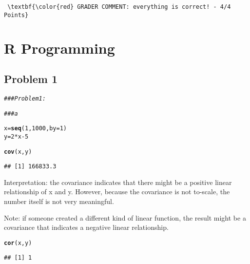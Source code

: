 \documentclass[12pt,letter]{article}\usepackage[]{graphicx}\usepackage[]{color}
\makeatletter
\newcommand{\hlnum}[1]{\textcolor[rgb]{0.686,0.059,0.569}{#1}}%
\newcommand{\hlcom}[1]{\textcolor[rgb]{0.678,0.584,0.686}{\textit{#1}}}%
\newcommand{\hlopt}[1]{\textcolor[rgb]{0,0,0}{#1}}%
\newcommand{\hlstd}[1]{\textcolor[rgb]{0.345,0.345,0.345}{#1}}%
\newcommand{\hlkwb}[1]{\textcolor[rgb]{0.69,0.353,0.396}{#1}}%
\newcommand{\hlkwc}[1]{\textcolor[rgb]{0.333,0.667,0.333}{#1}}%
\newcommand{\hlkwd}[1]{\textcolor[rgb]{0.737,0.353,0.396}{\textbf{#1}}}%
\newenvironment{kframe}{%
 \def\at@end@of@kframe{}%
 \ifinner\ifhmode%
  \def\at@end@of@kframe{\end{minipage}}%
  \begin{minipage}{\columnwidth}%
 \fi\fi%
 \def\FrameCommand##1{\hskip\@totalleftmargin \hskip-\fboxsep
 \colorbox{shadecolor}{##1}\hskip-\fboxsep
     \hskip-\linewidth \hskip-\@totalleftmargin \hskip\columnwidth}%
 \MakeFramed {\advance\hsize-\width
   \@totalleftmargin\z@ \linewidth\hsize
   \@setminipage}}%
 {\par\unskip\endMakeFramed%
 \at@end@of@kframe}
\newenvironment{knitrout}{}{} %
\makeatother
\begin{document}
\begin{verbatim} \textbf{\color{red} GRADER COMMENT: everything is correct! - 4/4 Points} \end{verbatim}



\pagebreak

\section*{R Programming}

\subsection*{Problem 1}

\begin{knitrout}
\color{fgcolor}\begin{kframe}
\begin{alltt}
\hlcom{### Problem 1:}

\hlcom{### a}

\hlstd{x} \hlkwb{=} \hlkwd{seq}\hlstd{(}\hlnum{1}\hlstd{,} \hlnum{1000}\hlstd{,} \hlkwc{by} \hlstd{=} \hlnum{1}\hlstd{)}
\hlstd{y} \hlkwb{=} \hlnum{2} \hlopt{*} \hlstd{x} \hlopt{-} \hlnum{5}

\hlkwd{cov}\hlstd{(x, y)}
\end{alltt}
\begin{verbatim}
## [1] 166833.3
\end{verbatim}
\end{kframe}
\end{knitrout}

Interpretation: the covariance indicates that there might be a positive linear relationship of x and y. However, because the covariance is not to-scale, the number itself is not very meaningful.

Note: if someone created a different kind of linear function, the result might be a covariance that indicates a negative linear relationship.

\begin{knitrout}
\color{fgcolor}\begin{kframe}
\begin{alltt}
\hlkwd{cor}\hlstd{(x, y)}
\end{alltt}
\begin{verbatim}
## [1] 1
\end{verbatim}
\end{kframe}
\end{knitrout}
\end{document}
